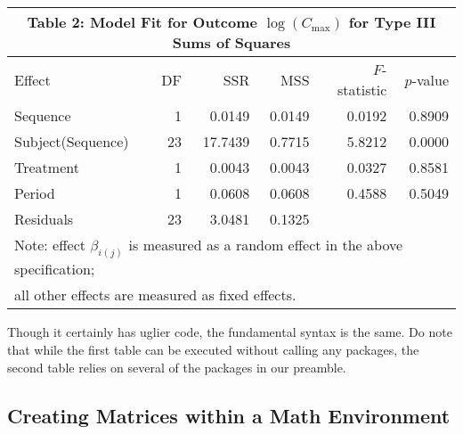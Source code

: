 \documentclass[12pt]{article}	%
\begin{document}
	\begin{center}
		\begin{tabular}{lrrrrr}
			\multicolumn{6}{c}{Table 2: Model Fit for Outcome $\log (C_{\max})$ for Type III Sums of Squares} \\ \hline \hline
			Effect & DF & \hphantom{www} SSR	& \hphantom{www} MSS & $F$-statistic & \hphantom{wi} $p$-value \\ \hline
			\rowcolor{Gray} Sequence		& 1 	& 0.0149		& 0.0149 & 0.0192	& 0.8909	\\
			Subject(Sequence)			& 23	& 17.7439		& 0.7715 & 5.8212	& 0.0000	\\
			\rowcolor{Gray} Treatment		& 1 	& 0.0043		& 0.0043 & 0.0327	& 0.8581	\\
			Period           				& 1 	& 0.0608		& 0.0608 & 0.4588	& 0.5049	\\ \hline
			\rowcolor{Gray} Residuals		& 23	& 3.0481		& 0.1325 &		&		\\ \hline \hline
			\multicolumn{6}{l}{Note: effect $\beta_{i(j)}$ is measured as a random effect in the above specification;} \\
			\multicolumn{6}{l}{all other effects are measured as fixed effects.}
		\end{tabular}
	\end{center}

\noindent Though it certainly has uglier code, the fundamental syntax is the same. Do note that while the first table can be executed without calling any packages, the second table relies on several of the packages in our preamble.

\subsection{Creating Matrices within a Math Environment}
\end{document}
